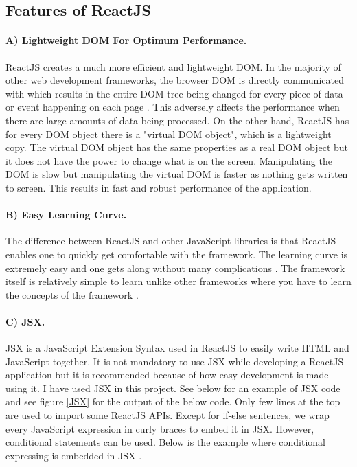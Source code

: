 \subsection{Features of ReactJS}
\paragraph{A) Lightweight DOM For Optimum Performance.}
ReactJS creates a much more efficient and lightweight DOM. In the majority of other web development frameworks, the browser DOM is directly communicated with which results in the entire DOM tree being changed for every piece of data or event happening on each page \cite{aggarwal2018modern}. This adversely affects the performance when there are large amounts of data being processed. 
On the other hand, ReactJS has for every DOM object there is a "virtual DOM object", which is a lightweight copy. The virtual DOM object has the same properties as a real DOM object but it does not have the power to change what is on the screen. Manipulating the DOM is slow but manipulating the virtual DOM is faster as nothing gets written to screen. This results in fast and robust performance of the application.

\paragraph{B) Easy Learning Curve.}
The difference between ReactJS and other JavaScript libraries is that ReactJS enables one to quickly get comfortable with the framework. The learning curve is extremely easy and one gets along without many complications \cite{aggarwal2018modern}. The framework itself is relatively simple to learn unlike other frameworks where you have to learn the concepts of the framework \cite{aggarwal2018modern, islam2017reactjs}. 

\paragraph{C) JSX.}
JSX is a JavaScript Extension Syntax used in ReactJS to easily write HTML and JavaScript together. It is not mandatory to use JSX while developing a ReactJS application but it is recommended because of how easy development is made using it. I have used JSX in this project. See below for an example of JSX code and see figure \ref{JSX} for the output of the below code. Only few lines at the top are used to import some ReactJS APIs. Except for if-else sentences, we wrap every JavaScript expression in curly braces to embed it in JSX. However, conditional statements can be used. Below is the example where conditional expressing is embedded in JSX \cite{JSX}.

